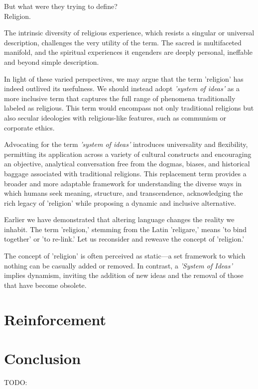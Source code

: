\documentclass[12pt,a4]{article}
\begin{document}
But what were they trying to define?\\
Religion.
 \par

The intrinsic diversity of religious experience, which resists a singular or universal description, challenges the very utility of the term. The sacred is multifaceted manifold, and the spiritual experiences it engenders are deeply personal, ineffable and beyond simple description.
\par
In light of these varied perspectives, we may argue that the term 'religion' has indeed outlived its usefulness. We should instead adopt \textit{'system of ideas'} as a more inclusive term that captures the full range of phenomena traditionally labeled as religious. This term would encompass not only traditional religions but also secular ideologies with religious-like features, such as communism or corporate ethics.

\par
Advocating for the term \textit{'system of ideas'} introduces universality and flexibility, permitting its application across a variety of cultural constructs and encouraging an objective, analytical conversation free from the dogmas, biases, and historical baggage associated with traditional religions. This replacement term provides a broader and more adaptable framework for understanding the diverse ways in which humans seek meaning, structure, and transcendence, acknowledging the rich legacy of 'religion' while proposing a dynamic and inclusive alternative.

\par
Earlier we have demonstrated that altering language changes the reality we inhabit. The term 'religion,' stemming from the Latin 'religare,' means 'to bind together' or 'to re-link.' Let us reconsider and reweave the concept of 'religion.'
\par
The concept of 'religion' is often perceived as static—a set framework to which nothing can be casually added or removed. In contrast, a \textit{'System of Ideas'} implies dynamism, inviting the addition of new ideas and the removal of those that have become obsolete.
\par





\section{Reinforcement}

\par


    

\section{Conclusion}

 

TODO:



 


\end{document}
